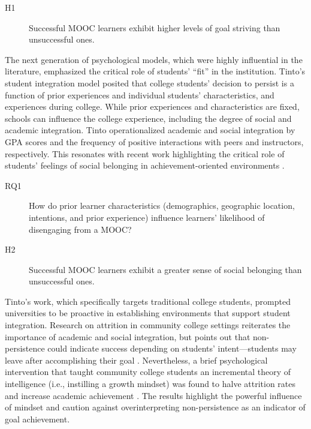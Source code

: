 \documentclass{sigchi}\usepackage[]{graphicx}\usepackage[]{color}
\begin{document}
\begin{description}
  \item[H1] Successful MOOC learners exhibit higher levels of goal striving than unsuccessful ones.
\end{description}

The next generation of psychological models, which were highly influential in the literature, emphasized the critical role of students' ``fit'' in the institution. Tinto's \citeyear{tinto1975dropout} student integration model posited that college students' decision to persist is a function of prior experiences and individual students' characteristics, and experiences during college. While prior experiences and characteristics are fixed, schools can influence the college experience, including the degree of social and academic integration. Tinto operationalized academic and social integration by GPA scores and the frequency of positive interactions with peers and instructors, respectively. This resonates with recent work highlighting the critical role of students' feelings of social belonging in achievement-oriented environments \cite{walton2007question}. 

\begin{description}
  \item[RQ1] How do prior learner characteristics (demographics, geographic location, intentions, and prior experience) influence learners' likelihood of disengaging from a MOOC?
  \item[H2] Successful MOOC learners exhibit a greater sense of social belonging than unsuccessful ones.
\end{description}

Tinto's work, which specifically targets traditional college students, prompted universities to be proactive in establishing environments that support student integration. Research on attrition in community college settings reiterates the importance of academic and social integration, but points out that non-persistence could indicate success depending on students' intent---students may leave after accomplishing their goal \cite{bers1991persistence}. Nevertheless, a brief psychological intervention that taught community college students an incremental theory of intelligence (i.e., instilling a growth mindset) was found to halve attrition rates and increase academic achievement \cite{paunesku2012brief}. The results highlight the powerful influence of mindset and caution against overinterpreting non-persistence as an indicator of goal achievement.
\end{document}
